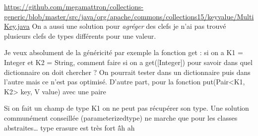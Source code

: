 \url{https://github.com/megamattron/collections-generic/blob/master/src/java/org/apache/commons/collections15/keyvalue/MultiKey.java} On a aussi une solution pour \textsl{agréger} des clefs je n'ai pas trouvé plusieurs clefs de types différents pour une valeur.

Je veux absolument de la généricité par exemple la fonction get : si on a K1 = Integer et K2 = String, comment faire si on a get([Integer]) pour savoir dans quel dictionnaire on doit chercher ? On pourrait tester dans un dictionnaire puis dans l'autre mais ce n'est pas optimisé. D'autre part, pour la fonction put(Pair<K1, K2> key, V value) avec une paire





Si on fait un champ de type K1 on ne peut pas récupérer son type. Une solution communément conseillée (parameterizedtype) ne marche que pour les classes abstraites\dots{} type erasure est très fort \^\^ ah ah